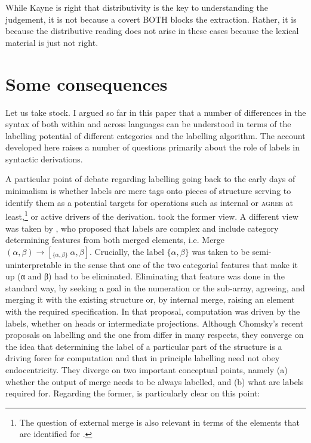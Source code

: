 \documentclass[output=paper]{langsci/langscibook}
\begin{document}
While Kayne is right that distributivity is the key to understanding the
judgement, it is not because a covert BOTH blocks the extraction. Rather, it is
because the distributive reading does not arise in these cases because the
lexical material is just not right.

\section{Some consequences}\label{consequences}

Let us take stock. I argued so far in this paper that a number of differences
in the syntax of  both within and across languages can be
understood in terms of the labelling potential of different
categories and the labelling algorithm. The account developed here raises a
number of questions primarily about the role of labels in syntactic
derivations.

A particular point of debate regarding labelling going back to
the early days of minimalism is whether labels are mere tags onto pieces of
structure serving to identify them as a potential targets for operations such
as internal  or \textsc{agree} at least,\footnote{The question of
external merge is also relevant in terms of the elements that are identified
for .} or active drivers of the derivation.
\citet{Chomsky1993,Chomsky1995} took the former view.  A different view was
taken by \cite{adger-tsoulas:99}, who proposed that labels are complex and
include category determining features from both merged elements, i.e. Merge$(α,
β) \rightarrow [_{\{α,β\}}\ α, β ]$. Crucially, the label $ \{α,β\}$ was taken
to be semi-uninterpretable in the sense that one of the two categorial features
that make it up (α and β) had to be eliminated.  Eliminating that feature was
done in the standard way, by seeking a goal in the numeration or the sub-array,
agreeing, and merging it with the existing structure or, by internal merge,
raising an element with the required specification. In that proposal,
computation was driven by the labels, whether on heads or intermediate
projections. Although Chomsky's recent proposals on labelling and the one from
\citet{adger-tsoulas:99} differ in many respects, they converge on the idea
that determining the label of a particular part of the structure is a driving
force for computation and that in principle labelling need not obey
endocentricity.  They diverge on two important conceptual points, namely (a)
whether the output of merge needs to be always labelled, and (b) what are
labels required for. Regarding the former, \citet[6]{Chomsky2015} is
particularly clear on this point:
\end{document}
